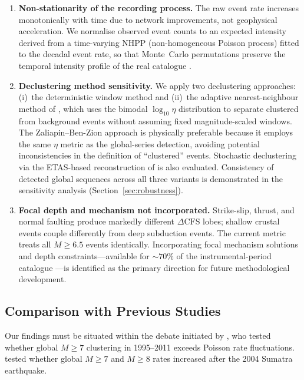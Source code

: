 \documentclass[draft]{agujournal2019}
\begin{document}
\begin{enumerate}
\item \textbf{Non-stationarity of the recording process.}
The raw event rate increases monotonically with time due to network
improvements, not geophysical acceleration.  We normalise observed event
counts to an expected intensity derived from a time-varying NHPP
(non-homogeneous Poisson process) fitted to the decadal event rate, so
that Monte~Carlo permutations preserve the temporal intensity profile of
the real catalogue \citep{Michael2011, ShearerStark2012}.

\item \textbf{Declustering method sensitivity.}
We apply two declustering approaches: (i)~the deterministic
\citet{Gardner1974} window method and (ii)~the adaptive
nearest-neighbour method of \citet{ZaliapinBenZion2013,ZaliapinBenZion2016},
which uses the bimodal $\log_{10}\eta$ distribution to separate clustered
from background events without assuming fixed magnitude-scaled windows.
The Zaliapin--Ben-Zion approach is physically preferable because it
employs the same $\eta$ metric as the global-series detection, avoiding
potential inconsistencies in the definition of ``clustered'' events.
Stochastic declustering via the ETAS-based reconstruction of
\citet{Zhuang2004} is also evaluated.
Consistency of detected global sequences across all three variants is
demonstrated in the sensitivity analysis (Section~\ref{sec:robustness}).

\item \textbf{Focal depth and mechanism not incorporated.}
Strike-slip, thrust, and normal faulting produce markedly different
$\Delta\mathrm{CFS}$ lobes; shallow crustal events couple differently
from deep subduction events.  The current metric treats all $M \geq 6.5$
events identically.  Incorporating focal mechanism solutions and depth
constraints---available for $\sim\!70\%$ of the instrumental-period
catalogue \citep{Engdahl1998}---is identified as the primary direction for
future methodological development.

\end{enumerate}

\subsection{Comparison with Previous Studies}
\label{subsec:comparison}

Our findings must be situated within the debate initiated by
\citet{Michael2011}, who tested whether global $M \geq 7$ clustering in
1995--2011 exceeds Poisson rate fluctuations.
\citet{ShearerStark2012} tested whether global $M \geq 7$ and $M \geq 8$
rates increased after the 2004 Sumatra earthquake.
\end{document}
